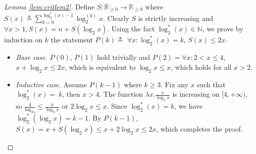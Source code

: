 \begin{proof}[Lemma \ref{lem:critlem2}]
	Define $S: \mathbb{R}_{\ge 0}\to \mathbb{R}_{\ge 0}$ where $S(x) \triangleq \sum_{k = 0}^{\log_2^*(x) - 1}\log_2^{(k)}x$. Clearly $S$ is strictly increasing and $\forall x>1, S(x) = n + S(\log_2 x)$. Using the fact $\log_2^*(x)\in \mathbb{N}$, we prove by induction on $k$ the statement $P(k) \triangleq$ $\forall x: \log_2^*(x) = k$, $S(x)\le 2x$.
	\begin{itemize}[leftmargin=*]
		\item \emph{Base case.} $P(0)$, $P(1)$ hold trivially and $P(2) = \forall x: 2 < x \le 4$, $x + \log_2x \le 2x$, which is equivalent to $\log_2x \le x$, which holds for all $x > 2$.
		\item \emph{Inductive case.} Assume $P(k-1)$ where $k\ge 3$. Fix any $x$ such that $\log_2^*(x)=~k$, then $x > 4$. The function $\lambda x.\frac{x}{\log_2x}$ is increasing on $[4, +\infty)$, so $\frac{4}{\log_24} \le \frac{x}{\log_2x}$ or $2\log_2x \le x$. Since $\log_2^*(x) = k$, we have $\log_2^*(\log_2x) = k-1$. By $P(k-1)$, $S(x) = x + S(\log_2x) \le x + 2\log_2x \le 2x$, which completes the proof.
	\end{itemize}
\end{proof}

